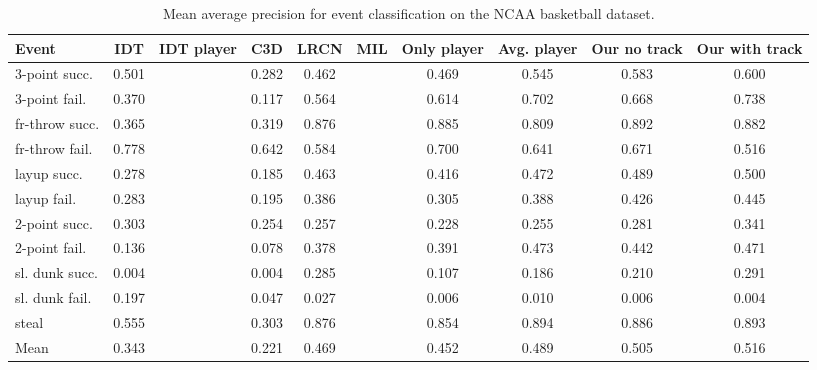 \documentclass[10pt,twocolumn,letterpaper]{article}
\begin{document}
\begin{table}[t!]
\begin{center}
\small
 \begin{tabular}{|l|c|c|c|c|c|c|c|c|c|}
  \hline
Event & IDT\cite{Wang_CVPR11} & IDT\cite{Wang_CVPR11} player & C3D \cite{Tran_arxiv14} & LRCN \cite{Donahue_arxiv14} & MIL\cite{} & Only player & Avg. player & Our no track & Our with track \\ \hline \hline

3-point succ.    & 0.501 &  & 0.282 & 0.462 &  & 0.469 & 0.545 & 0.583 & 0.600 \\
3-point fail.    & 0.370 &  & 0.117 & 0.564 &  & 0.614 & 0.702 & 0.668 & 0.738 \\
fr-throw succ. & 0.365 &  & 0.319 & 0.876 &  & 0.885 & 0.809 & 0.892 & 0.882 \\
fr-throw fail. & 0.778 &  & 0.642 & 0.584 &  & 0.700 & 0.641 & 0.671 & 0.516 \\
layup succ.      & 0.278 &  & 0.185 & 0.463 &  & 0.416 & 0.472 & 0.489 & 0.500 \\
layup fail.      & 0.283 &  & 0.195 & 0.386 &  & 0.305 & 0.388 & 0.426 & 0.445 \\
2-point succ.    & 0.303 &  & 0.254 & 0.257 &  & 0.228 & 0.255 & 0.281 & 0.341 \\
2-point fail.    & 0.136 &  & 0.078 & 0.378 &  & 0.391 & 0.473 & 0.442 & 0.471 \\
sl. dunk succ.  & 0.004 &  & 0.004 & 0.285 &  & 0.107 & 0.186 & 0.210 & 0.291 \\
sl. dunk fail.  & 0.197 &  & 0.047 & 0.027 &  & 0.006 & 0.010 & 0.006 & 0.004 \\
steal            & 0.555 &  & 0.303 & 0.876 &  & 0.854 & 0.894 & 0.886 & 0.893 \\ \hline \hline
Mean             & 0.343 &  & 0.221 & 0.469 &  & 0.452 & 0.489 & 0.505 & 0.516 \\ \hline
  \end{tabular}
\end{center}
  \caption{Mean average precision for event classification on the NCAA basketball dataset.}
  \label{tab:event_class}
\end{table}
\end{document}
